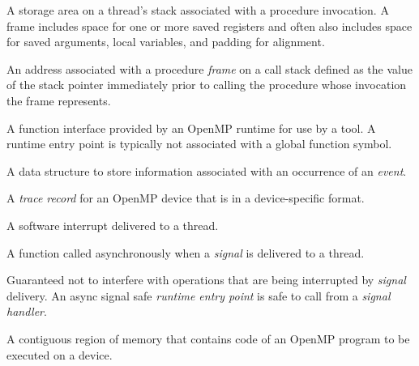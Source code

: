 \glossarydefstart
A storage area on a thread's stack associated with a procedure invocation. A frame includes space for 
one or more saved registers and often also includes space for saved arguments, local variables, 
and padding for alignment.
\glossarydefend

\glossarydefstart
An address associated with a procedure \emph{frame} on a call stack defined as the value of the stack pointer immediately prior 
to calling the procedure whose invocation the frame represents.
\glossarydefend

\glossarydefstart
A function interface provided by an OpenMP runtime for use by a tool. A runtime entry point is
typically not associated with a global function symbol.
\glossarydefend

\glossarydefstart
A data structure to store information associated with an occurrence of an \emph{event}.
\glossarydefend

\glossarydefstart
A \emph{trace record} for an OpenMP device that is in a device-specific format. 
\glossarydefend

\glossarydefstart
A software interrupt delivered to a thread.
\glossarydefend

\glossarydefstart
A function called asynchronously when a \emph{signal} is delivered to a thread.
\glossarydefend

\glossarydefstart
Guaranteed not to interfere with operations that are being interrupted by \emph{signal} delivery. 
An async signal safe \emph{runtime entry point} is safe to call from a \emph{signal handler}.
\glossarydefend

\glossarydefstart
A contiguous region of memory that contains code of an OpenMP program to be executed on a device.
\glossarydefend


